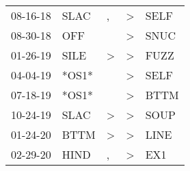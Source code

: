 \begin{supertabular}{p{0.07\textwidth}p{0.06\textwidth}p{0.02\textwidth}p{0.02\textwidth}p{0.06\textwidth}}
          08-16-18\textsuperscript{} &           SLAC\textsuperscript{} &                , &     \textgreater &           SELF\textsuperscript{} \\
          08-30-18\textsuperscript{} &            OFF\textsuperscript{} &                  &     \textgreater &           SNUC\textsuperscript{} \\
          01-26-19\textsuperscript{} &           SILE\textsuperscript{} &     \textgreater &     \textgreater &           FUZZ\textsuperscript{} \\
          04-04-19\textsuperscript{} &                            *OS1* &                  &     \textgreater &           SELF\textsuperscript{} \\
          07-18-19\textsuperscript{} &                            *OS1* &                  &     \textgreater &           BTTM\textsuperscript{} \\
          10-24-19\textsuperscript{} &           SLAC\textsuperscript{} &     \textgreater &     \textgreater &           SOUP\textsuperscript{} \\
          01-24-20\textsuperscript{} &           BTTM\textsuperscript{} &     \textgreater &     \textgreater &           LINE\textsuperscript{} \\
          02-29-20\textsuperscript{} &           HIND\textsuperscript{} &                , &     \textgreater &            EX1\textsuperscript{} \\
\end{supertabular}
